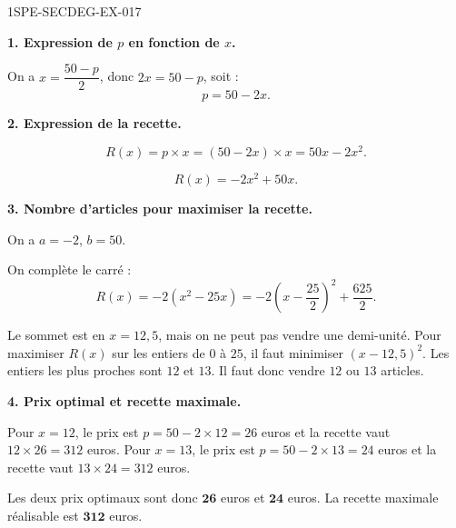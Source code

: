 \begin{corrige}{1SPE-SECDEG-EX-017}

\textbf{1. Expression de $p$ en fonction de $x$.}


On a $x = \dfrac{50 - p}{2}$, donc $2x = 50 - p$, soit :
\[p = 50 - 2x.\]

\medskip
\textbf{2. Expression de la recette.}


\[R(x) = p \times x = (50 - 2x) \times x = 50x - 2x^2.\]

\[\boxed{R(x) = -2x^2 + 50x.}\]

\medskip
\textbf{3. Nombre d'articles pour maximiser la recette.}


On a $a = -2$, $b = 50$.

On complète le carré :
\[
R(x)=-2\left(x^2-25x\right)
=-2\left(x-\frac{25}{2}\right)^2+\frac{625}{2}.
\]

Le sommet est en $x=12{,}5$, mais on ne peut pas vendre une demi-unité.
Pour maximiser $R(x)$ sur les entiers de $0$ à $25$, il faut minimiser
$\left(x-12{,}5\right)^2$. Les entiers les plus proches sont $12$ et $13$.
Il faut donc vendre $12$ ou $13$ articles.

\medskip
\textbf{4. Prix optimal et recette maximale.}


Pour $x=12$, le prix est $p=50-2\times12=26$ euros et la recette vaut
$12\times26=312$ euros.
Pour $x=13$, le prix est $p=50-2\times13=24$ euros et la recette vaut
$13\times24=312$ euros.

Les deux prix optimaux sont donc $\mathbf{26}$ euros et $\mathbf{24}$ euros.
La recette maximale réalisable est $\mathbf{312}$ euros.

\end{corrige}
